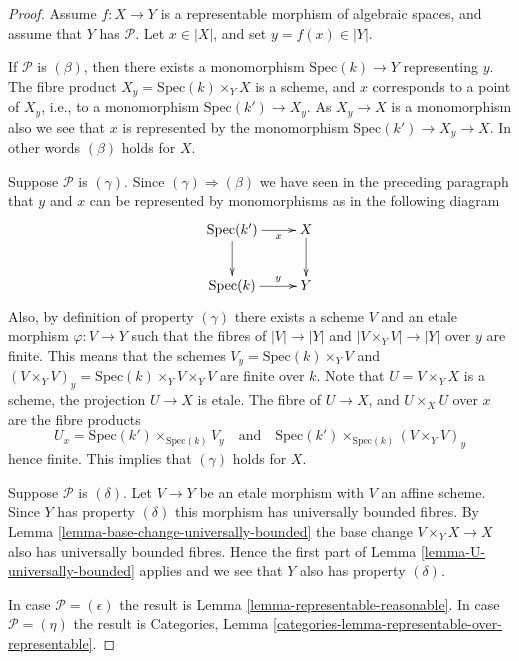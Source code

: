 \begin{proof}
Assume $f : X \to Y$ is a representable morphism of algebraic spaces,
and assume that $Y$ has $\mathcal{P}$. Let $x \in |X|$, and set
$y = f(x) \in |Y|$.

\medskip\noindent
If $\mathcal{P}$ is $(\beta)$, then there exists a monomorphism
$\text{Spec}(k) \to Y$ representing $y$. The fibre product
$X_y = \text{Spec}(k) \times_Y X$ is a scheme, and $x$ corresponds
to a point of $X_y$, i.e., to a monomorphism $\text{Spec}(k') \to X_y$.
As $X_y \to X$ is a monomorphism also we see that $x$ is represented
by the monomorphism $\text{Spec}(k') \to X_y \to X$. In other words
$(\beta)$ holds for $X$.

\medskip\noindent
Suppose $\mathcal{P}$ is $(\gamma)$. Since $(\gamma) \Rightarrow (\beta)$
we have seen in the preceding paragraph that $y$ and $x$ can be represented
by monomorphisms as in the following diagram
$$
\xymatrix{
\text{Spec}(k') \ar[r]_-x \ar[d] & X \ar[d] \\
\text{Spec}(k) \ar[r]^-y & Y
}
$$
Also, by definition of property $(\gamma)$ there exists a scheme $V$ and an
etale morphism $\varphi : V \to Y$ such that the fibres of $|V| \to |Y|$
and $|V \times_Y V| \to |Y|$ over $y$ are finite. This means that the
schemes $V_y = \text{Spec}(k) \times_Y V$ and
$(V \times_Y V)_y = \text{Spec}(k) \times_Y V \times_Y V$
are finite over $k$.
Note that $U = V \times_Y X$ is a scheme, the projection
$U \to X$ is etale. The fibre of $U \to X$, and $U \times_X U$ over $x$
are the fibre products
$$
U_x = 
\text{Spec}(k') \times_{\text{Spec}(k)} V_y
\quad\text{and}\quad
\text{Spec}(k') \times_{\text{Spec}(k)} (V \times_Y V)_y
$$
hence finite. This implies that $(\gamma)$ holds for $X$.

\medskip\noindent
Suppose $\mathcal{P}$ is $(\delta)$. Let $V \to Y$ be an etale morphism with
$V$ an affine scheme. Since $Y$ has property $(\delta)$ this morphism has
universally bounded fibres. By
Lemma \ref{lemma-base-change-universally-bounded}
the base change $V \times_Y X \to X$ also has universally bounded fibres.
Hence the first part of
Lemma \ref{lemma-U-universally-bounded}
applies and we see that $Y$ also has property $(\delta)$.

\medskip\noindent
In case $\mathcal{P} = (\epsilon)$ the result is
Lemma \ref{lemma-representable-reasonable}.
In case $\mathcal{P} = (\eta)$ the result is
Categories, Lemma \ref{categories-lemma-representable-over-representable}.
\end{proof}

